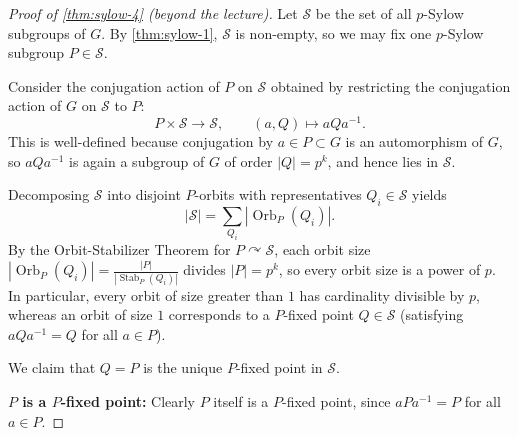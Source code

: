 \begin{content}

\begin{proof}[Proof of \cref{thm:sylow-4} (beyond the lecture)]
Let $\mathcal{S}$ be the set of all $p$-Sylow subgroups of $G$. By \cref{thm:sylow-1}, $\mathcal{S}$ is non-empty, so we may fix one $p$-Sylow subgroup $P \in \mathcal{S}$.

Consider the conjugation action of $P$ on $\mathcal{S}$ obtained by restricting the conjugation action of $G$ on $\mathcal{S}$ to $P$:
\[
P \times \mathcal{S} \to \mathcal{S}, \qquad (a, Q) \mapsto a Q a^{-1}.
\]
This is well-defined because conjugation by $a \in P \subset G$ is an automorphism of $G$, so $a Q a^{-1}$ is again a subgroup of $G$ of order $|Q| = p^k$, and hence lies in $\mathcal{S}$.

Decomposing $\mathcal{S}$ into disjoint $P$-orbits with representatives $Q_i \in \mathcal{S}$ yields
\begin{equation}\label{eq:S-orbit-decomp}
|\mathcal{S}| = \sum_{Q_i} |\operatorname{Orb}_P(Q_i)|.
\end{equation}
By the Orbit-Stabilizer Theorem for $P \curvearrowright \mathcal{S}$, each orbit size $|\operatorname{Orb}_P(Q_i)| = \frac{|P|}{|\operatorname{Stab}_P(Q_i)|}$ divides $|P| = p^k$, so every orbit size is a power of $p$. In particular, every orbit of size greater than $1$ has cardinality divisible by $p$, whereas an orbit of size $1$ corresponds to a $P$-fixed point $Q \in \mathcal{S}$ (satisfying $a Q a^{-1} = Q$ for all $a \in P$).

We claim that $Q = P$ is the unique $P$-fixed point in $\mathcal{S}$.

\textbf{$P$ is a $P$-fixed point:} Clearly $P$ itself is a $P$-fixed point, since $a P a^{-1} = P$ for all $a \in P$.


\end{proof}
\end{content}
